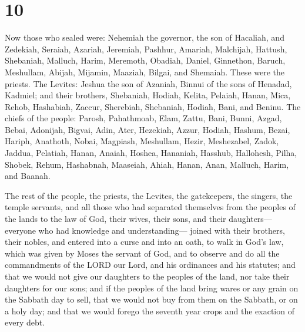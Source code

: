 \hypertarget{section-9}{%
\section{10}\label{section-9}}

 Now those who sealed were: Nehemiah the governor, the son
of Hacaliah, and Zedekiah,  Seraiah, Azariah, Jeremiah,
 Pashhur, Amariah, Malchijah,  Hattush,
Shebaniah, Malluch,  Harim, Meremoth, Obadiah, 
Daniel, Ginnethon, Baruch,  Meshullam, Abijah, Mijamin,
 Maaziah, Bilgai, and Shemaiah. These were the priests.
 The Levites: Jeshua the son of Azaniah, Binnui of the sons
of Henadad, Kadmiel;  and their brothers, Shebaniah,
Hodiah, Kelita, Pelaiah, Hanan,  Mica, Rehob, Hashabiah,
 Zaccur, Sherebiah, Shebaniah,  Hodiah, Bani,
and Beninu.  The chiefs of the people: Parosh, Pahathmoab,
Elam, Zattu, Bani,  Bunni, Azgad, Bebai, 
Adonijah, Bigvai, Adin,  Ater, Hezekiah, Azzur,
 Hodiah, Hashum, Bezai,  Hariph, Anathoth,
Nobai,  Magpiash, Meshullam, Hezir, 
Meshezabel, Zadok, Jaddua,  Pelatiah, Hanan, Anaiah,
 Hoshea, Hananiah, Hasshub,  Hallohesh, Pilha,
Shobek,  Rehum, Hashabnah, Maaseiah,  Ahiah,
Hanan, Anan,  Malluch, Harim, and Baanah.

 The rest of the people, the priests, the Levites, the
gatekeepers, the singers, the temple servants, and all those who had
separated themselves from the peoples of the lands to the law of God,
their wives, their sons, and their daughters---everyone who had
knowledge and understanding---  joined with their brothers,
their nobles, and entered into a curse and into an oath, to walk in
God's law, which was given by Moses the servant of God, and to observe
and do all the commandments of the LORD our Lord, and his ordinances and
his statutes;  and that we would not give our daughters to
the peoples of the land, nor take their daughters for our sons;
 and if the peoples of the land bring wares or any grain on
the Sabbath day to sell, that we would not buy from them on the Sabbath,
or on a holy day; and that we would forego the seventh year crops and
the exaction of every debt.


